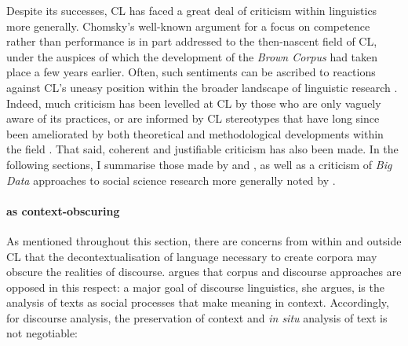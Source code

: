 Despite its successes, \gls{CL} has faced a great deal of criticism within linguistics more generally. Chomsky's well\hyp{}known argument for a focus on competence rather than performance \parencite*{chomsky_aspects_1965} is in part addressed to the then-nascent field of \gls{CL}, under the auspices of which the development of the \emph{Brown Corpus} had taken place a few years earlier. Often, such sentiments can be ascribed to reactions against \gls{CL}'s uneasy position within the broader landscape of linguistic research \cite[its initial conflict with a better-established generativist tradition; its methodological differences from other functional linguistic approaches; the unfamiliar research areas with which it is associated, etc.---see][]{baker_sociolinguistics_2010}. Indeed, much criticism has been levelled at \gls{CL} by those who are only vaguely aware of its practices, or are informed by \gls{CL} stereotypes that have long since been ameliorated by both theoretical and methodological developments within the field \cite{baker_sociolinguistics_2010}. That said, coherent and justifiable criticism has also been made. In the following sections, I summarise those made by \textcite{virtanen_discourse_2009} and \textcite{widdowson_description_1991,widdowson_limitations_2000,widdowson_text_2008}, as well as a criticism of \emph{Big Data} approaches to social science research more generally noted by \textcite{boyd_critical_2012}.


\paragraph{ as context-obscuring} \label{sect:constrip}

As mentioned throughout this section, there are concerns from within and outside \gls{CL} that the decontextualisation of language necessary to create corpora may obscure the realities of discourse. \textcite{virtanen_discourse_2009} argues that \gls{corpus} and discourse approaches are opposed in this respect: a major goal of discourse linguistics, she argues, is the analysis of texts as social processes that make meaning in context. Accordingly, for discourse analysis, the preservation of context and \emph{in situ} analysis of text is not negotiable:

